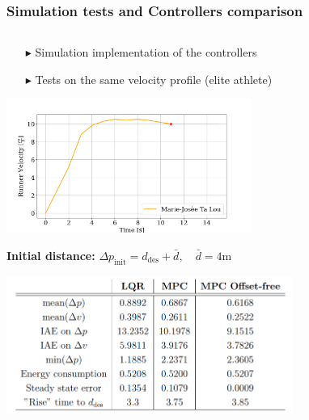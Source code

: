 \documentclass[9pt, aspectratio=169]{beamer}
\begin{document}
\begin{frame}
\frametitle{Simulation tests and Controllers comparison}
\begin{columns}
\begin{column}{0.57\textwidth}
\centering
\begin{block}{}
\begin{itemize}
\footnotesize
	\item[$\blacktriangleright$] Simulation implementation of the controllers
	\item[$\blacktriangleright$] Tests on the same velocity profile (elite athlete)
\end{itemize}
\end{block}
\vspace{-0.2cm}
	\begin{center}
  		\includegraphics[width=0.6\textwidth]{Test_Velocities} 
	\end{center}
\textbf{Initial distance:}
\centering
$\Delta p_\text{init} = d_\text{des} + \bar{d}, \quad \bar{d}= 4$m
	\begin{center}
  		\includegraphics[width=0.7\textwidth]{Ta_Lou/Table} 
	\end{center}



\end{column}
\end{columns}
\end{frame}
\end{document}
